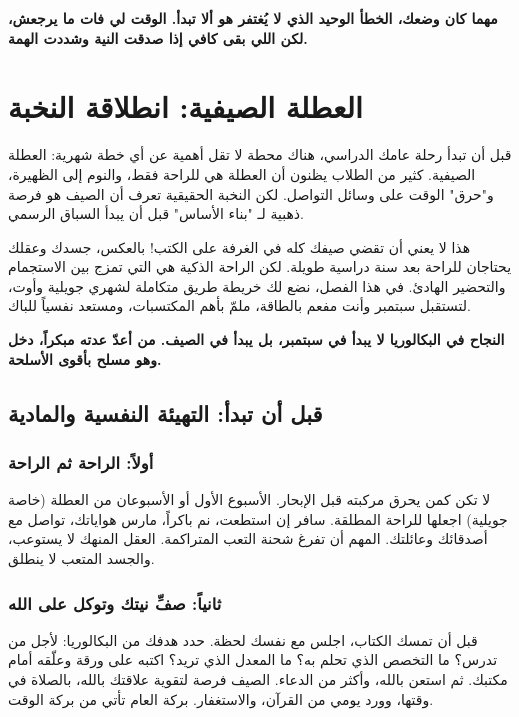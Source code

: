 \documentclass[12pt,a4paper]{book}
\newcommand{\importantAr}[1]{%
	\begin{important}
		\bfseries #1
	\end{important}
}
\begin{document}
	\importantAr{مهما كان وضعك، الخطأ الوحيد الذي لا يُغتفر هو ألا تبدأ.
		الوقت لي فات ما يرجعش، لكن اللي بقى كافي إذا صدقت النية وشددت الهمة.}
	
	\section{العطلة الصيفية: انطلاقة النخبة}
	
	قبل أن تبدأ رحلة عامك الدراسي، هناك محطة لا تقل أهمية عن أي خطة شهرية: العطلة الصيفية. كثير من الطلاب يظنون أن العطلة هي للراحة فقط، والنوم إلى الظهيرة، و"حرق" الوقت على وسائل التواصل. لكن النخبة الحقيقية تعرف أن الصيف هو فرصة ذهبية لـ "بناء الأساس" قبل أن يبدأ السباق الرسمي.
	
	هذا لا يعني أن تقضي صيفك كله في الغرفة على الكتب! بالعكس، جسدك وعقلك يحتاجان للراحة بعد سنة دراسية طويلة. لكن الراحة الذكية هي التي تمزج بين الاستجمام والتحضير الهادئ. في هذا الفصل، نضع لك خريطة طريق متكاملة لشهري جويلية وأوت، لتستقبل سبتمبر وأنت مفعم بالطاقة، ملمّ بأهم المكتسبات، ومستعد نفسياً للباك.
	
	\importantAr{النجاح في البكالوريا لا يبدأ في سبتمبر، بل يبدأ في الصيف. من أعدّ عدته مبكراً، دخل وهو مسلح بأقوى الأسلحة.}
	
	\subsection{قبل أن تبدأ: التهيئة النفسية والمادية}
	
	\subsubsection{أولاً: الراحة ثم الراحة}
	لا تكن كمن يحرق مركبته قبل الإبحار. الأسبوع الأول أو الأسبوعان من العطلة (خاصة جويلية) اجعلها للراحة المطلقة. سافر إن استطعت، نم باكراً، مارس هواياتك، تواصل مع أصدقائك وعائلتك. المهم أن تفرغ شحنة التعب المتراكمة. العقل المنهك لا يستوعب، والجسد المتعب لا ينطلق.
	
	\subsubsection{ثانياً: صفِّ نيتك وتوكل على الله}
	قبل أن تمسك الكتاب، اجلس مع نفسك لحظة. حدد هدفك من البكالوريا: لأجل من تدرس؟ ما التخصص الذي تحلم به؟ ما المعدل الذي تريد؟ اكتبه على ورقة وعلّقه أمام مكتبك. ثم استعن بالله، وأكثر من الدعاء. الصيف فرصة لتقوية علاقتك بالله، بالصلاة في وقتها، وورد يومي من القرآن، والاستغفار. بركة العام تأتي من بركة الوقت.
	
\end{document}
